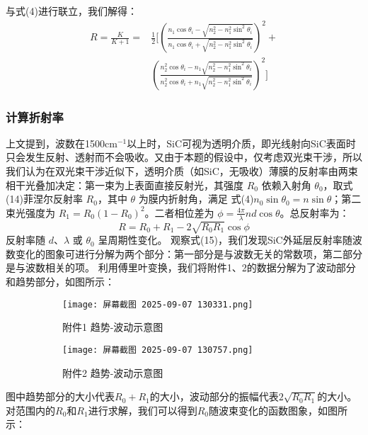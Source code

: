 \documentclass{cumcmthesis}
\begin{document}
与式(4)进行联立，我们解得：
	\begin{equation}
	\begin{split}
	R = \frac{K}{K + 1} = &\frac{1}{2}\bigg[ \left( \frac{n_1 \cos\theta_i - \sqrt{n_2^2 - n_1^2 \sin^2\theta_i}}{n_1 \cos\theta_i + \sqrt{n_2^2 - n_1^2 \sin^2\theta_i}} \right)^2 + \\
	&\left( \frac{n_2^2 \cos\theta_i - n_1 \sqrt{n_2^2 - n_1^2 \sin^2\theta_i}}{n_2^2 \cos\theta_i + n_1 \sqrt{n_2^2 - n_1^2 \sin^2\theta_i}} \right)^2 \bigg]
	\end{split}
	\end{equation}
\subsubsection{计算折射率}
上文提到，波数在1500cm$^{-1}$以上时，SiC可视为透明介质，即光线射向SiC表面时只会发生反射、透射而不会吸收。又由于本题的假设中，仅考虑双光束干涉，所以我们认为在双光束干涉近似下，透明介质（如SiC，无吸收）薄膜的反射率由两束相干光叠加决定：第一束为上表面直接反射光，其强度 $ R_0 $ 依赖入射角 $ \theta_0 $，取式(14)菲涅尔反射率 $ R_0 $，其中 $ \theta $ 为膜内折射角，满足 式(4)$ n_0 \sin\theta_0 = n \sin\theta $；第二束光强度为 $ R_1 = R_0 (1 - R_0)^2 $。二者相位差为 $ \phi = \frac{4\pi}{\lambda} n d \cos\theta $。总反射率为：
\begin{equation}
R = R_0 + R_1 - 2\sqrt{R_0 R_1} \cos\phi
\end{equation}
反射率随 $ d $、$ \lambda $ 或 $ \theta_0 $ 呈周期性变化。
观察式(15)，我们发现SiC外延层反射率随波数变化的图象可进行分解为两个部分：第一部分是与波数无关的常数项，第二部分是与波数相关的项。
利用傅里叶变换，我们将附件1、2的数据分解为了波动部分和趋势部分，如图所示：
\begin{figure}[H]
  \centering
  \begin{subfigure}[b]{0.49\linewidth}
    \texttt{[image: 屏幕截图 2025-09-07 130331.png]}
    \caption{附件1 趋势-波动示意图}
    \label{fig:att1}
  \end{subfigure}
  \hfill
  \begin{subfigure}[b]{0.49\linewidth}
    \texttt{[image: 屏幕截图 2025-09-07 130757.png]}
    \caption{附件2 趋势-波动示意图}
    \label{fig:att2}
  \end{subfigure}
  \caption{}
  \label{fig:double}
\end{figure}
图中趋势部分的大小代表$R_0+R_1$的大小，波动部分的振幅代表$2\sqrt{R_0 R_1}$的大小。
对范围内的$R_0$和$R_1$进行求解，我们可以得到$R_0$随波束变化的函数图象，如图所示：
\end{document}
